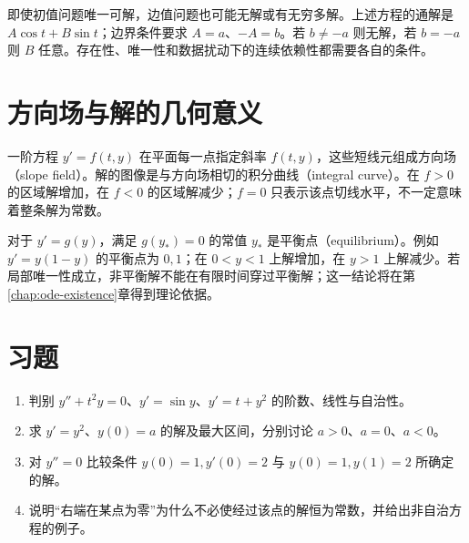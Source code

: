 即使初值问题唯一可解，边值问题也可能无解或有无穷多解。上述方程的通解是 $A\cos t+B\sin t$；边界条件要求 $A=a$、$-A=b$。若 $b\ne-a$ 则无解，若 $b=-a$ 则 $B$ 任意。存在性、唯一性和数据扰动下的连续依赖性都需要各自的条件。

\section{方向场与解的几何意义}
一阶方程 $y'=f(t,y)$ 在平面每一点指定斜率 $f(t,y)$，这些短线元组成方向场（slope field）。解的图像是与方向场相切的积分曲线（integral curve）。在 $f>0$ 的区域解增加，在 $f<0$ 的区域解减少；$f=0$ 只表示该点切线水平，不一定意味着整条解为常数。

对于 $y'=g(y)$，满足 $g(y_*)=0$ 的常值 $y_*$ 是平衡点（equilibrium）。例如 $y'=y(1-y)$ 的平衡点为 $0,1$；在 $0<y<1$ 上解增加，在 $y>1$ 上解减少。若局部唯一性成立，非平衡解不能在有限时间穿过平衡解；这一结论将在第\ref{chap:ode-existence}章得到理论依据。

\section{习题}
\begin{enumerate}
 \item\label{ex:ode-classify} 判别 $y''+t^2y=0$、$y'=\sin y$、$y'=t+y^2$ 的阶数、线性与自治性。
 \item\label{ex:ode-square} 求 $y'=y^2$、$y(0)=a$ 的解及最大区间，分别讨论 $a>0$、$a=0$、$a<0$。
 \item\label{ex:ode-boundary-intro} 对 $y''=0$ 比较条件 $y(0)=1,y'(0)=2$ 与 $y(0)=1,y(1)=2$ 所确定的解。
 \item 说明“右端在某点为零”为什么不必使经过该点的解恒为常数，并给出非自治方程的例子。
\end{enumerate}

